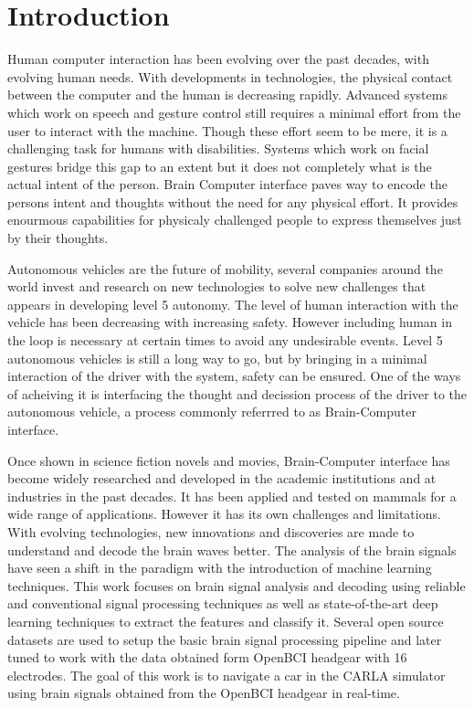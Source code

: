 \section*{Introduction}
Human computer interaction has been evolving over the past decades, with evolving human needs. With developments in technologies, the physical 
contact between the computer and the human is decreasing rapidly. Advanced systems which work on speech and gesture control still requires a minimal
effort from the user to interact with the machine. Though these effort seem to be mere, it is a challenging task for humans with disabilities. 
Systems which work on facial gestures bridge this gap to an extent but it does not completely what is the actual intent of the person. Brain Computer
interface paves way to encode the persons intent and thoughts without the need for any physical effort. It provides enourmous capabilities for 
physicaly challenged people to express themselves just by their thoughts. 

Autonomous vehicles are the future of mobility, several companies around the world invest and research on new technologies to solve new challenges 
that appears in developing level 5 autonomy. The level of human interaction with the vehicle has been decreasing with increasing safety. However
including human in the loop is necessary at certain times to avoid any undesirable events. Level  5 autonomous vehicles is still a long way to go, 
but by bringing in a minimal interaction of the driver with the system, safety can be ensured. One of the ways of acheiving it is interfacing the
thought and decission process of the driver to the autonomous vehicle, a process commonly referrred to as Brain-Computer interface. 

Once shown in science fiction novels and movies, Brain-Computer interface has become widely researched and developed in the academic institutions 
and at industries in the past decades. It has been applied and tested on mammals for a wide range of applications. However it has its own challenges
and limitations. With evolving technologies, new innovations and discoveries are made to understand and decode the brain waves better. The analysis
of the brain signals have seen a shift in the paradigm with the introduction of machine learning techniques. This work focuses on brain signal analysis and decoding 
using reliable and conventional signal processing techniques as well as state-of-the-art deep learning techniques to extract the features and classify
it. Several open source datasets are used to setup the basic brain signal processing pipeline and later tuned to work with the data obtained form
OpenBCI headgear with 16 electrodes. The goal of this work is to navigate a car in the CARLA simulator using brain signals obtained from the OpenBCI
headgear in real-time.

